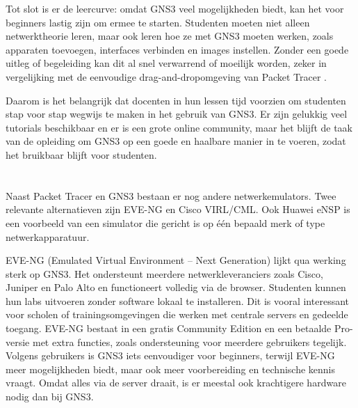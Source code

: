 Tot slot is er de leercurve: omdat GNS3 veel mogelijkheden biedt, kan het voor beginners lastig zijn om ermee te starten. Studenten moeten niet alleen netwerktheorie leren, maar ook leren hoe ze met GNS3 moeten werken, zoals apparaten toevoegen, interfaces verbinden en images instellen. Zonder een goede uitleg of begeleiding kan dit al snel verwarrend of moeilijk worden, zeker in vergelijking met de eenvoudige drag-and-dropomgeving van Packet Tracer \autocite{Amrizal2022}.

\vspace{0.3cm}

Daarom is het belangrijk dat docenten in hun lessen tijd voorzien om studenten stap voor stap wegwijs te maken in het gebruik van GNS3. Er zijn gelukkig veel tutorials beschikbaar en er is een grote online community, maar het blijft de taak van de opleiding om GNS3 op een goede en haalbare manier in te voeren, zodat het bruikbaar blijft voor studenten.


\section{}
\label{sec:Alternatieve tools: EVE-NG, Cisco VIRL en andere}

Naast Packet Tracer en GNS3 bestaan er nog andere netwerkemulators. Twee relevante alternatieven zijn EVE-NG en Cisco VIRL/CML. Ook Huawei eNSP is een voorbeeld van een simulator die gericht is op één bepaald merk of type netwerkapparatuur.

\vspace{0.3cm}

EVE-NG (Emulated Virtual Environment – Next Generation) lijkt qua werking sterk op GNS3. Het ondersteunt meerdere netwerkleveranciers zoals Cisco, Juniper en Palo Alto en functioneert volledig via de browser. Studenten kunnen hun labs uitvoeren zonder software lokaal te installeren. Dit is vooral interessant voor scholen of trainingsomgevingen die werken met centrale servers en gedeelde toegang. EVE-NG bestaat in een gratis Community Edition en een betaalde Pro-versie met extra functies, zoals ondersteuning voor meerdere gebruikers tegelijk. Volgens gebruikers is GNS3 iets eenvoudiger voor beginners, terwijl EVE-NG meer mogelijkheden biedt, maar ook meer voorbereiding en technische kennis vraagt. Omdat alles via de server draait, is er meestal ook krachtigere hardware nodig dan bij GNS3\autocite{eve-ng}.

\vspace{0.3cm}

